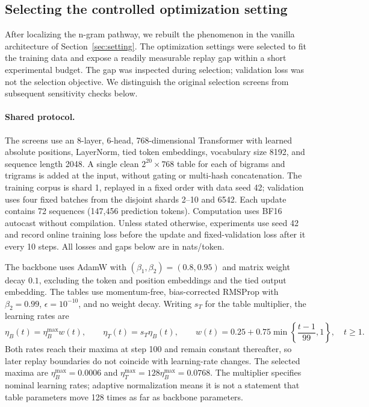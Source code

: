 \subsection{Selecting the controlled optimization setting}
\label{app:parameter-selection}

After localizing the n-gram pathway, we rebuilt the phenomenon in the vanilla architecture of Section~\ref{sec:setting}. The optimization settings were selected to fit the training data and expose a readily measurable replay gap within a short experimental budget. The gap was inspected during selection; validation loss was not the selection objective. We distinguish the original selection screens from subsequent sensitivity checks below.

\paragraph{Shared protocol.}
The screens use an 8-layer, 6-head, 768-dimensional Transformer with learned absolute positions, LayerNorm, tied token embeddings, vocabulary size 8192, and sequence length 2048. A single clean $2^{20}\times768$ table for each of bigrams and trigrams is added at the input, without gating or multi-hash concatenation. The training corpus is shard 1, replayed in a fixed order with data seed 42; validation uses four fixed batches from the disjoint shards 2--10 and 6542. Each update contains 72 sequences (147,456 prediction tokens). Computation uses BF16 autocast without compilation. Unless stated otherwise, experiments use seed 42 and record online training loss before the update and fixed-validation loss after it every 10 steps. All losses and gaps below are in nats/token.

The backbone uses AdamW with $(\beta_1,\beta_2)=(0.8,0.95)$ and matrix weight decay $0.1$, excluding the token and position embeddings and the tied output embedding. The tables use momentum-free, bias-corrected RMSProp with $\beta_2=0.99$, $\epsilon=10^{-10}$, and no weight decay. Writing $s_T$ for the table multiplier, the learning rates are
\begin{equation}
 \eta_B(t)=\eta_B^{\max}w(t),\qquad
 \eta_T(t)=s_T\eta_B(t),\qquad
 w(t)=0.25+0.75\min\!\left\{\frac{t-1}{99},1\right\},\quad t\geq1.
 \label{eq:selection-lr}
\end{equation}
Both rates reach their maxima at step 100 and remain constant thereafter, so later replay boundaries do not coincide with learning-rate changes. The selected maxima are $\eta_B^{\max}=0.0006$ and $\eta_T^{\max}=128\eta_B^{\max}=0.0768$. The multiplier specifies nominal learning rates; adaptive normalization means it is not a statement that table parameters move 128 times as far as backbone parameters.


